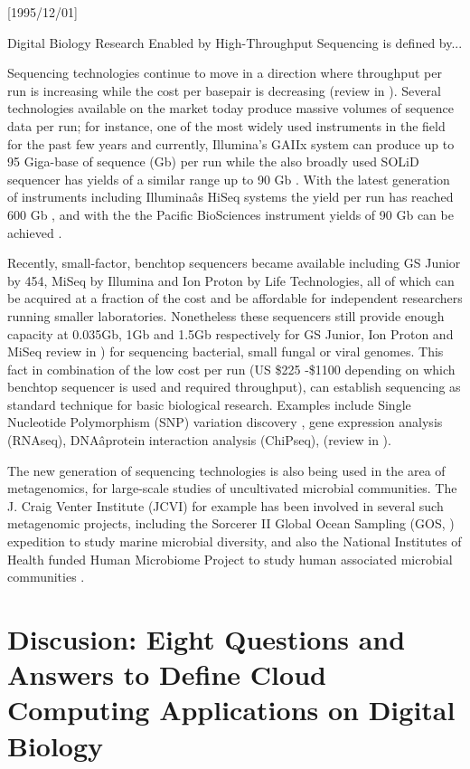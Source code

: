 \NeedsTeXFormat{LaTeX2e}[1995/12/01] \documentclass[10pt]{bmc_article}
\newenvironment{bmcformat}{\begin{raggedright}\baselineskip20pt\sloppy\setboolean{publ}{false}}{\end{raggedright}\baselineskip20pt\sloppy}
\begin{document}
\begin{bmcformat}
Digital Biology Research Enabled by High-Throughput Sequencing is defined by... \pb

Sequencing technologies continue to move in a direction where throughput per run is increasing while the cost
per basepair is decreasing (review in \cite{Mason2012}).  Several technologies available on the market today
produce massive volumes of sequence data per run; for instance, one of the most widely used instruments in the
field for the past few years and currently, Illumina's GAIIx system can produce up to 95 Giga-base of sequence
(Gb) per run \cite{Illumina} while the also broadly used SOLiD sequencer has yields of a similar range up to
90 Gb \cite{solid5500}. With the latest generation of instruments including Illuminaâs HiSeq systems the yield
per run has reached 600 Gb \cite{Illumina}, and with the the Pacific BioSciences instrument yields of 90 Gb
can be achieved \cite{}. \pb

Recently, small-factor, benchtop sequencers became available including GS Junior by 454, MiSeq by Illumina and
Ion Proton by Life Technologies, all of which can be acquired at a fraction of the cost and be affordable for
independent researchers running smaller laboratories. Nonetheless these sequencers still provide enough
capacity at 0.035Gb, 1Gb and 1.5Gb respectively for GS Junior, Ion Proton and MiSeq review in
\cite{Loman2012}) for sequencing bacterial, small fungal or viral genomes.  This fact in combination of the
low cost per run (US \$225 -\$1100 depending on which benchtop sequencer is used and required throughput), can
establish sequencing as standard technique for basic biological research.  Examples include Single Nucleotide
Polymorphism (SNP) variation discovery , gene expression analysis (RNAseq), DNAâprotein interaction analysis
(ChiPseq), (review in \cite{Mardis2008}).

The new generation of sequencing technologies is also being used in the area of metagenomics, for large-scale
studies of uncultivated microbial communities.  The J.  Craig Venter Institute (JCVI) for example has been
involved in several such metagenomic projects, including the Sorcerer II Global Ocean Sampling (GOS,
\cite{Rusch2007}) expedition to study marine microbial diversity, and also the National Institutes of Health
funded Human Microbiome Project to study human associated microbial communities \cite{Nelson2010}. \pb



\section*{Discusion: Eight Questions and Answers to Define Cloud Computing Applications on Digital Biology} \pb 


\end{bmcformat}
\end{document}

